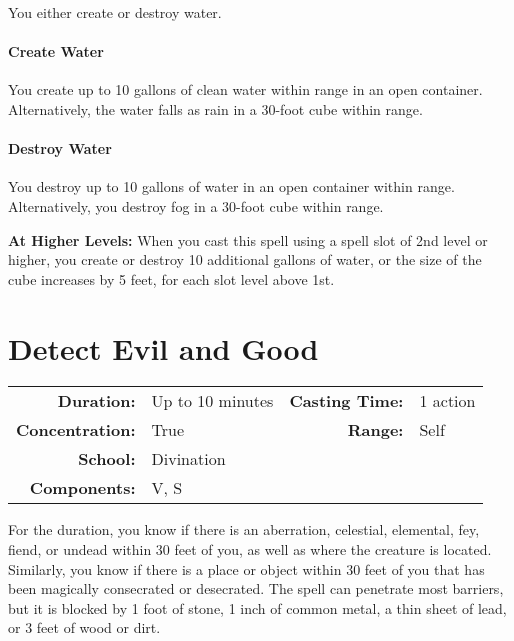 \documentclass[a5paper, 12pt]{memoir}
\begin{document}
\vspace{1\baselineskip}\noindent You either create or destroy water. \paragraph{Create Water} You create up to 10 gallons of clean water within range in an open container. Alternatively, the water falls as rain in a 30-foot cube within range. \paragraph{Destroy Water} You destroy up to 10 gallons of water in an open container within range. Alternatively, you destroy fog in a 30-foot cube within range.

\vspace{8pt} \noindent\textbf{At Higher Levels:} When you cast this spell using a spell slot of 2nd level or higher, you create or destroy 10 additional gallons of water, or the size of the cube increases by 5 feet, for each slot level above 1st.
\newpage
\section*{Detect Evil and Good}

{
\small\centering\vspace{-6pt}
\begin{tabular}{rlrl}
\toprule

\textbf{Duration:} & Up to 10 minutes &
\textbf{Casting Time:} & 1 action \\
\textbf{Concentration:} & True &
\textbf{Range:} & Self \\
\textbf{School:} & Divination \\
\textbf{Components:} & \multicolumn{3}{p{0.7\textwidth}}{V, S}\\

\bottomrule
\end{tabular}
}

\vspace{1\baselineskip}\noindent For the duration, you know if there is an aberration, celestial, elemental, fey, fiend, or undead within 30 feet of you, as well as where the creature is located. Similarly, you know if there is a place or object within 30 feet of you that has been magically consecrated or desecrated. The spell can penetrate most barriers, but it is blocked by 1 foot of stone, 1 inch of common metal, a thin sheet of lead, or 3 feet of wood or dirt.
\end{document}
